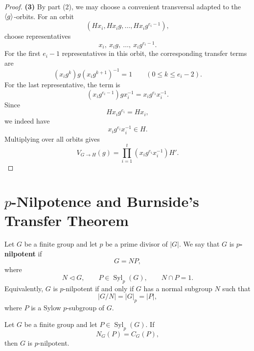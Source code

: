 \begin{proof}
\textbf{(3)} By part (2), we may choose a convenient transversal adapted to the $\langle g\rangle$-orbits. For an orbit
\[
    (Hx_i,Hx_ig,\ldots,Hx_ig^{e_i-1}),
\]
choose representatives
\[
    x_i,\ x_ig,\ \ldots,\ x_ig^{e_i-1}.
\]
For the first $e_i-1$ representatives in this orbit, the corresponding transfer terms are
\[
    (x_ig^k)g(x_ig^{k+1})^{-1}=1
    \qquad
    (0\leq k\leq e_i-2).
\]
For the last representative, the term is
\[
    (x_ig^{e_i-1})g x_i^{-1}
    =
    x_ig^{e_i}x_i^{-1}.
\]
Since
\[
    Hx_ig^{e_i}=Hx_i,
\]
we indeed have
\[
    x_ig^{e_i}x_i^{-1}\in H.
\]
Multiplying over all orbits gives
\[
    V_{G\to H}(g)
    =
    \prod_{i=1}^t
    \left(x_i g^{e_i}x_i^{-1}\right)H'.
\]
\end{proof}

\section{\texorpdfstring{$p$}{p}-Nilpotence and Burnside's Transfer Theorem}

\begin{definition}
Let $G$ be a finite group and let $p$ be a prime divisor of $|G|$. We say that $G$ is
\textbf{$p$-nilpotent} if
\[
    G=NP,
\]
where
\[
    N\lhd G,\qquad P\in \operatorname{Syl}_p(G),
    \qquad N\cap P=1.
\]
Equivalently, $G$ is $p$-nilpotent if and only if $G$ has a normal subgroup $N$ such that
\[
    |G/N|=|G|_p=|P|,
\]
where $P$ is a Sylow $p$-subgroup of $G$.
\end{definition}

\begin{theorem}
Let $G$ be a finite group and let $P\in \operatorname{Syl}_p(G)$. If
\[
    N_G(P)=C_G(P),
\]
then $G$ is $p$-nilpotent.
\end{theorem}

